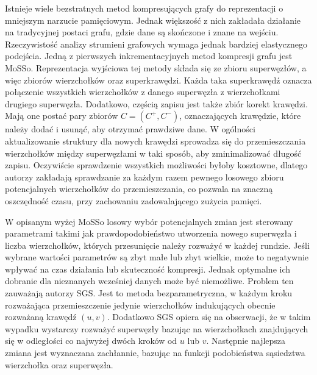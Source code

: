    Istnieje wiele bezstratnych metod kompresujących grafy do reprezentacji o mniejszym narzucie pamięciowym. Jednak większość z nich zakładała działanie na tradycyjnej postaci grafu, gdzie  dane są skończone i znane na wejściu. Rzeczywistość analizy strumieni grafowych wymaga jednak bardziej elastycznego podejścia. Jedną z pierwszych inkrementacyjnych metod kompresji grafu jest MoSSo\cite{Ko_Kook_Shin_2020}. Reprezentacja wyjściowa tej metody składa się ze zbioru superwęzłów, a więc zbiorów wierzchołków oraz superkrawędzi. Każda taka superkrawędź oznacza połączenie wszystkich wierzchołków z danego superwęzła z wierzchołkami drugiego superwęzła. Dodatkowo, częścią zapisu jest także zbiór korekt krawędzi. Mają one postać pary zbiorów $C = (C^{+}, C^{-})$, oznaczających krawędzie, które należy dodać i usunąć, aby otrzymać prawdziwe dane. W ogólności aktualizowanie struktury dla nowych krawędzi sprowadza się do przemieszczania wierzchołków między superwęzłami w taki sposób, aby zminimalizować długość zapisu. Oczywiście sprawdzenie wszystkich możliwości byłoby kosztowne, dlatego autorzy zakładają sprawdzanie za każdym razem pewnego losowego zbioru potencjalnych wierzchołków do przemieszczania, co pozwala na znaczną oszczędność czasu, przy zachowaniu zadowalającego zużycia pamięci.

    W opisanym wyżej MoSSo losowy wybór potencjalnych zmian jest sterowany parametrami takimi jak prawdopodobieństwo utworzenia nowego superwęzła i liczba wierzchołków, których przesunięcie należy rozważyć w każdej rundzie. Jeśli wybrane wartości parametrów są zbyt małe lub zbyt wielkie, może to negatywnie wpływać na czas działania lub skuteczność kompresji. Jednak optymalne ich dobranie dla nieznanych wcześniej danych może być niemożliwe. Problem ten zauważają autorzy SGS\cite{Ma_Liu_Yang_Yang_Li_2022}. Jest to metoda bezparametryczna, w każdym kroku rozważająca przemieszczenie jedynie wierzchołków indukujących obecnie rozważaną krawędź $(u,v)$. Dodatkowo SGS opiera się na obserwacji, że w takim wypadku wystarczy rozważyć superwęzły bazując na wierzchołkach znajdujących się w odległości co najwyżej dwóch kroków od $u$ lub $v$. Następnie najlepsza zmiana jest wyznaczana zachłannie, bazując na funkcji podobieństwa sąsiedztwa wierzchołka oraz superwęzła.

